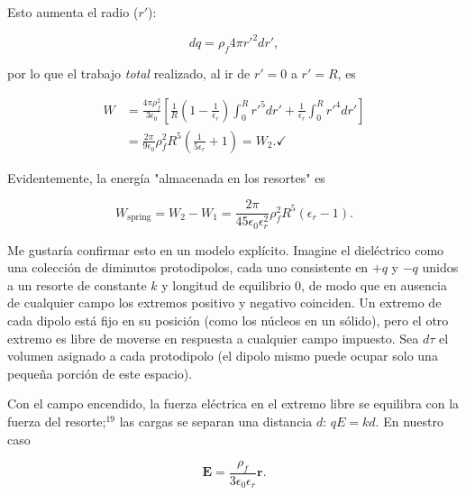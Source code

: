 \documentclass[12pt,a4paper]{report}
\newcommand{\esp}{\vspace{0.5cm}}
\begin{document}
	\esp
	
	Esto aumenta el radio ($r'$):
	
	\begin{equation}
		dq = \rho_f 4\pi r'^2 dr',
	\end{equation}
	
	\esp
	
	\noindent por lo que el trabajo \textit{total} realizado, al ir de $r' = 0$ a $r' = R$, es
	
	\esp
	
	\begin{equation}
		\begin{aligned}
			W &= \frac{4\pi \rho_f^2}{3\epsilon_0} \left[ \frac{1}{R} \left( 1 - \frac{1}{\epsilon_r} \right) \int_0^R r'^5 dr' + \frac{1}{\epsilon_r} \int_0^R r'^4 dr' \right] \\
			&= \frac{2\pi}{9\epsilon_0} \rho_f^2 R^5 \left( \frac{1}{5\epsilon_r} + 1 \right) = W_2. \checkmark
		\end{aligned}
	\end{equation}
	
	\esp
	
	Evidentemente, la energía "almacenada en los resortes" es
	
	\esp
	
	\begin{equation}
		W_{\text{spring}} = W_2 - W_1 = \frac{2\pi}{45\epsilon_0\epsilon_r^2} \rho_f^2 R^5 (\epsilon_r - 1).
	\end{equation}
	
	\esp
	
	Me gustaría confirmar esto en un modelo explícito. Imagine el dieléctrico como una colección de diminutos protodipolos, cada uno consistente en $+q$ y $-q$ unidos a un resorte de constante $k$ y longitud de equilibrio 0, de modo que en ausencia de cualquier campo los extremos positivo y negativo coinciden. Un extremo de cada dipolo está fijo en su posición (como los núcleos en un sólido), pero el otro extremo es libre de moverse en respuesta a cualquier campo impuesto. Sea $d\tau$ el volumen asignado a cada protodipolo (el dipolo mismo puede ocupar solo una pequeña porción de este espacio).
	
	\esp
	
	Con el campo encendido, la fuerza eléctrica en el extremo libre se equilibra con la fuerza del resorte;$^{19}$ las cargas se separan una distancia $d$: $qE = kd$. En nuestro caso
	
	\esp
	
	\begin{equation}
		\mathbf{E} = \frac{\rho_f}{3\epsilon_0\epsilon_r} \mathbf{r} .
	\end{equation}
	
\end{document}
